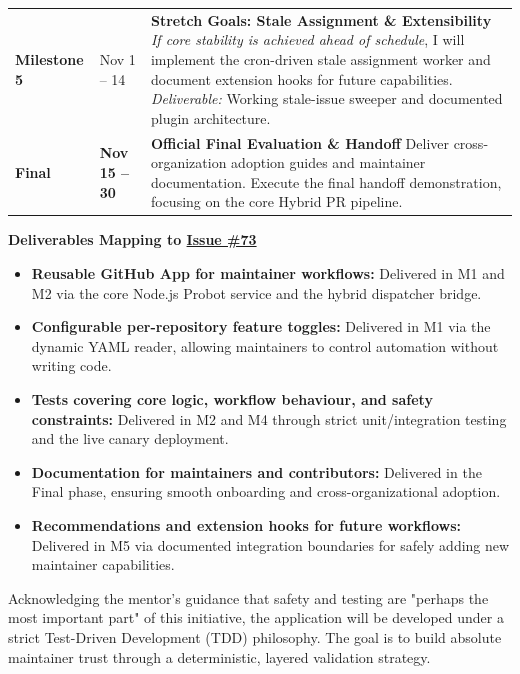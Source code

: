 \documentclass[11pt]{article}
\newcommand{\mainheading}[1]{\par\vspace{10pt}\noindent{\fontsize{15pt}{18pt}\selectfont\textcolor{headingblue}{#1}}
\par\vspace{4pt}}
\newcommand{\issueseventythree}{\href{https://github.com/LF-Decentralized-Trust-Mentorships/mentorship-program/issues/73}{Issue \#73}\xspace}
\begin{document}
\begin{table}[H]
\begin{tabularx}{\textwidth}{@{} >{\bfseries}l l X @{}}
Milestone 5 & Nov 1 -- 14 &
\textbf{Stretch Goals: Stale Assignment \& Extensibility} \newline
\textit{If core stability is achieved ahead of schedule}, I will implement the cron-driven stale assignment worker and document extension hooks for future capabilities. \newline \textit{Deliverable:} Working stale-issue sweeper and documented plugin architecture. \\

\rowcolor{gray!10}
Final & \textbf{Nov 15 -- 30} &
\textbf{Official Final Evaluation \& Handoff} \newline
Deliver cross-organization adoption guides and maintainer documentation. Execute the final handoff demonstration, focusing on the core Hybrid PR pipeline. \\

\bottomrule
\end{tabularx}
\end{table}

\textbf{Deliverables Mapping to \issueseventythree}
\begin{itemize}[leftmargin=18pt,itemsep=2pt,topsep=2pt]
    \item \textbf{Reusable GitHub App for maintainer workflows:} Delivered in M1 and M2 via the core Node.js Probot service and the hybrid dispatcher bridge.
    \item \textbf{Configurable per-repository feature toggles:} Delivered in M1 via the dynamic YAML reader, allowing maintainers to control automation without writing code.
    \item \textbf{Tests covering core logic, workflow behaviour, and safety constraints:} Delivered in M2 and M4 through strict unit/integration testing and the live canary deployment.
    \item \textbf{Documentation for maintainers and contributors:} Delivered in the Final phase, ensuring smooth onboarding and cross-organizational adoption.
    \item \textbf{Recommendations and extension hooks for future workflows:} Delivered in M5 via documented integration boundaries for safely adding new maintainer capabilities.
\end{itemize}

\mainheading{9. Testing Strategy \& Execution Quality}

Acknowledging the mentor's guidance that safety and testing are "perhaps the most important part" of this initiative, the application will be developed under a strict Test-Driven Development (TDD) philosophy. The goal is to build absolute maintainer trust through a deterministic, layered validation strategy.
\end{document}
